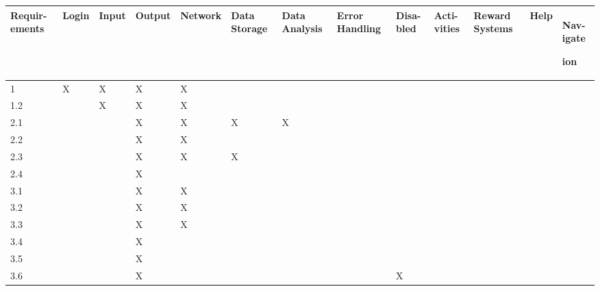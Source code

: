 \documentclass[12pt]{article}
\begin{document}
 \begin{tabular}{ |p{0.2cm}|p{0.1cm}|p{0.5cm}|p{0.1cm}|p{0.1cm}|p{0.1cm}|p{0.1cm}|p{0.1cm}|p{0.1cm}|p{0.1cm}|p{0.1cm}|p{0.1cm}|p{0.1cm}|  }
 \hline

 Requir-ements & Login & Input & Output & Network & Data Storage & Data Analysis &Error Handling &Disa-bled &Acti-vities &Reward Systems & Help & Nav-igate

 ion\\

 \hline

 1& X & X  & X  & X  &   &   &   &   &   &   &   &\\

 \hline

 1.2&  &X   &X   & X  &   &   &   &   &   &   &   &\\

 \hline

 2.1&  &   &  X & X  &  X &  X &   &   &   &   &   &\\

 \hline

 2.2&  &   & X  & X  &   &   &   &   &   &   &   &\\

 \hline

 2.3&  &   & X  & X  &  X &   &   &   &   &   &   &\\

 \hline

 2.4&  &   & X  &   &   &   &   &   &   &   &   &\\

 \hline

 3.1&  &   & X  & X  &   &   &   &   &   &   &   &\\

 \hline

 3.2&  &   & X  & X  &  &   &   &   &   &   &   &\\

 \hline

 3.3&  &   & X  & X  &  &   &   &   &   &   &   &\\

 \hline

 3.4&  &   & X  &   &   &   &   &   &   &   &   &\\

 \hline

 3.5&  &   &  X &   &   &   &   &   &   &   &   &\\

 \hline

 3.6&  &   &  X &   &   &   &   & X  &   &   &   &\\


\end{tabular}
\end{document}
